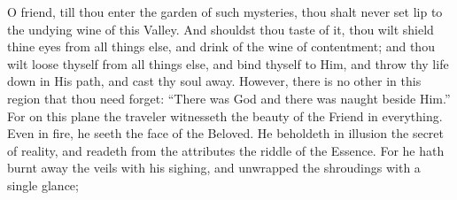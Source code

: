 \documentclass[12pt]{article}
\begin{document}
\vspace{2ex}
 {
O friend, till thou enter the garden of such mysteries, thou shalt never set lip to the undying wine of this Valley.
}
\vspace{2ex}
 {
And shouldst thou taste of it, thou wilt shield thine eyes from all things else, and drink of the wine of contentment;
}
\vspace{2ex}
 {
and thou wilt loose thyself from all things else, and bind thyself to Him, and throw thy life down in His path, and cast thy soul away.
}
\vspace{2ex}
 {
However, there is no other in this region that thou need forget: ``There was God and there was naught beside Him.''\footnotemark[30]
}
\vspace{2ex}
 {
For on this plane the traveler witnesseth the beauty of the Friend in everything.
}
\vspace{2ex}
 {
Even in fire, he seeth the face of the Beloved. He beholdeth in illusion the secret of reality, and readeth from the attributes the riddle of the Essence.
}
\vspace{2ex}
 {
For he hath burnt away the veils with his sighing, and unwrapped the shroudings with a single glance;
}
\end{document}

